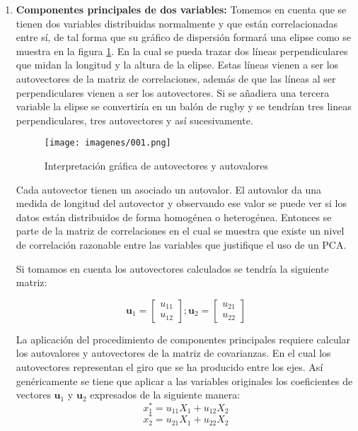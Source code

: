 \begin{enumerate}
    \item \textbf{Componentes principales de dos variables:} Tomemos en cuenta que se tienen dos variables distribuidas normalmente y que están correlacionadas entre sí, de tal forma que su gráfico de dispersión formará una elipse como se muestra en la figura \ref{fig:autovec_autova_2dim}. En la cual se pueda trazar dos líneas perpendiculares que midan la longitud y la altura de la elipse. Estas líneas vienen a ser los autovectores de la matriz de correlaciones, además de que las líneas al ser perpendiculares vienen a ser los autovectores. Si se añadiera una tercera variable la elipse se convertiría en un balón de rugby y se tendrían tres lineas perpendiculares, tres autovectores y así sucesivamente.

    \begin{figure}[htb]
    \centering
    \texttt{[image: imagenes/001.png]}
    \caption{Interpretación gráfica de autovectores y autovalores \citep{aldas2017analisis}}
    \label{fig:autovec_autova_2dim}
    \end{figure}

    Cada autovector tienen un asociado un autovalor. El autovalor da una medida de longitud del autovector y observando ese valor se puede ver si los datos están distribuidos de forma homogénea o heterogénea. Entonces se parte de la matriz de correlaciones en el cual se muestra que existe un nivel de correlación razonable entre las variables que justifique el uso de un PCA.

    Si tomamos en cuenta los autovectores calculados se tendría la siguiente matriz:

    $$\mathbf{u}_1 = \begin{bmatrix} u_{11} \\ u_{12} \end{bmatrix} ; \mathbf{u}_2 = \begin{bmatrix} u_{21} \\ u_{22} \end{bmatrix}$$


    La aplicación del procedimiento de componentes principales requiere calcular los autovalores y autovectores de la matriz de covarianzas. En el cual los autovectores representan el giro que se ha producido entre los ejes. Así genéricamente se tiene que aplicar a las variables originales los coeficientes de vectores $\mathbf{u}_1$ y $\mathbf{u}_2$ expresados de la siguiente manera:
    $${x}_{1}^{*}={u}_{11}X_1+{u}_{12}X_2$$
    $${x}_{2}^{*}={u}_{21}X_1+{u}_{22}X_2$$


\end{enumerate}
